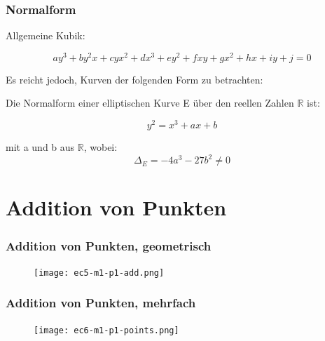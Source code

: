 \documentclass{beamer}
\newcommand{\R}{\mathbb{R}}
\begin{document}
\begin{frame}
  \frametitle{Normalform}
  Allgemeine Kubik:

  \begin{equation*}
    a y^3 + b y^2 x + c y x^2 + d x^3 + e y^2 + f x y + g x^2 +
    h x + i y + j = 0
  \end{equation*}

  Es reicht jedoch, Kurven der folgenden Form zu betrachten:

  \begin{definition}
    Die Normalform einer elliptischen Kurve E über den reellen Zahlen
    $\R$ ist:

    \begin{equation}
      y^2 = x^3 + ax + b
      \label{eq:weier}
    \end{equation}

    mit a und b aus $\R$, wobei:
    \begin{equation}
      \Delta_E = -4a^3 - 27b^2 \ne 0
    \end{equation}
  \end{definition}
\end{frame}


\section{Addition von Punkten}

\begin{frame}
  \frametitle{Addition von Punkten, geometrisch}
  \begin{figure}
    \texttt{[image: ec5-m1-p1-add.png]}
  \end{figure}
\end{frame}

\begin{frame}
  \frametitle{Addition von Punkten, mehrfach}
  \begin{figure}
    \texttt{[image: ec6-m1-p1-points.png]}
  \end{figure}
\end{frame}
\end{document}
